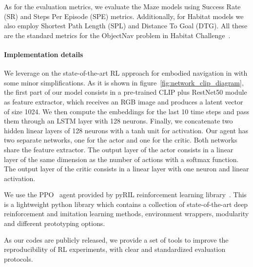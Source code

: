 As for the evaluation metrics, we evaluate the Maze models using Success Rate (SR) and Steps Per Episode (SPE) metrics.
Additionally, for Habitat models we also employ Shortest Path Length (SPL) and Distance To Goal (DTG).
All these are the standard metrics for the ObjectNav problem in Habitat Challenge~\cite{batra2020}.

\paragraph*{Implementation details}
We leverage on the state-of-the-art RL approach for embodied navigation in \cite{khandelwal2022} with some minor simplifications.
As it is shown in figure~\ref{fig:network_clip_diagram}, the first part of our model consists in a pre-trained CLIP plus RestNet50 module as feature extractor, which receives an RGB image and produces a latent vector of size 1024.
We then compute the embeddings for the last 10 time steps and pass them through an LSTM layer with 128 neurons.
Finally, we concatenate two hidden linear layers of 128 neurons with a tanh unit for activation.
Our agent has two separate networks, one for the actor and one for the critic.
Both networks share the feature extractor.
The output layer of the actor consists in a linear layer of the same dimension as the number of actions with a softmax function.
The output layer of the critic consists in a linear layer with one neuron and linear activation.

We use the PPO~\cite{schulman2017} agent provided by pyRIL reinforcement learning library~\cite{pyRIL}.
This is a lightweight python library which contains a collection of state-of-the-art deep reinforcement and imitation learning methods, environment wrappers, modularity and different prototyping options.

As our codes are publicly released, we provide a set of tools to improve the reproducibility of RL experiments, with clear and standardized evaluation protocols.

